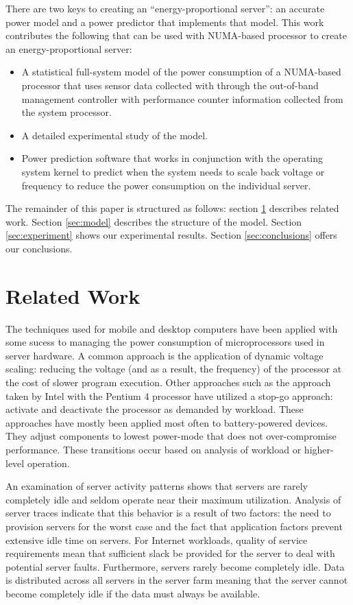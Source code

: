 \documentclass[times, 10pt,onecolumn]{article}
\begin{document}
There are two keys to creating an ``energy-proportional server'': an
accurate power model and a power predictor that implements that model.
This work contributes the following that can be used with NUMA-based processor
to create an energy-proportional server:
\begin{itemize}
\item A statistical full-system model of the power consumption of
  a NUMA-based processor that uses sensor data collected with through the
  out-of-band management controller with performance counter information
  collected from the system processor.
\item A detailed experimental study of the model.
\item Power prediction software that works in conjunction with the
  operating system kernel to predict when the system needs to scale back
  voltage or frequency to reduce the power consumption on the individual server.
\end{itemize}

The remainder of this paper is structured as follows: section
\ref{sec:related} describes related work.  Section \ref{sec:model}
describes the structure of the model.  Section \ref{sec:experiment}
shows our experimental results.  Section \ref{sec:conclusions} offers
our conclusions.

\section{Related Work}
\label{sec:related}
The techniques used for mobile and desktop computers have been applied
with some sucess to managing the power consumption of microprocessors
used in server hardware.  A common approach is the application of
dynamic voltage scaling: reducing the voltage (and as a result, the
frequency) of the processor at the cost of slower program
execution. Other approaches such as the approach taken by Intel with the
Pentium 4 processor have utilized a stop-go approach: activate and
deactivate the processor as demanded by workload.  These approaches have
mostly been applied most often to battery-powered devices.  They adjust
components to lowest power-mode that does not over-compromise
performance.  These transitions occur based on analysis of workload or
higher-level operation.

An examination of server activity patterns \cite{Fan2007}\cite{Barroso2007}
shows that servers are rarely completely idle and seldom operate near their
maximum utilization.   Analysis of server traces indicate that this behavior
is a result of two factors: the need to provision servers for the worst case
and the fact that application factors prevent extensive idle time on servers.
For Internet workloads, quality of service requirements mean that sufficient
slack be provided for the server to deal with potential server faults.
Furthermore, servers rarely become completely idle.   Data is distributed
across all servers in the server farm meaning that the server cannot become
completely idle if the data must always be available.  
\end{document}
